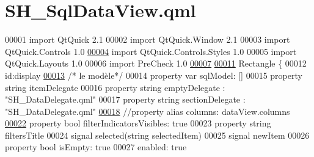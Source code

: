 \hypertarget{SH__SqlDataView_8qml}{\section{S\-H\-\_\-\-Sql\-Data\-View.\-qml}
\label{SH__SqlDataView_8qml}
}

\begin{DoxyCode}
00001 \textcolor{keyword}{import} QtQuick 2.1
00002 import QtQuick.Window 2.1
00003 import QtQuick.Controls 1.0
\hypertarget{SH__SqlDataView_8qml_source_l00004}{}\hyperlink{classSH__SqlDataView}{00004} import QtQuick.Controls.Styles 1.0
00005 import QtQuick.Layouts 1.0
00006 import PreCheck 1.0
\hypertarget{SH__SqlDataView_8qml_source_l00007}{}\hyperlink{classSH__SqlDataView_ad538d6f1dd43a7d01c7960a74ca131dc}{00007} 
\hypertarget{SH__SqlDataView_8qml_source_l00011}{}\hyperlink{classSH__SqlDataView_af2c0c75bb57606451699027fa74eeda2}{00011} Rectangle \{
00012     \textcolor{keywordtype}{id}:display
\hypertarget{SH__SqlDataView_8qml_source_l00013}{}\hyperlink{classSH__SqlDataView_a60486947b034f5fca72a2d5775ad1767}{00013}     \textcolor{comment}{/* le modèle*/}
00014     \textcolor{keyword}{property} var sqlModel: []
00015     \textcolor{keyword}{property} \textcolor{keywordtype}{string} itemDelegate
00016     \textcolor{keyword}{property} \textcolor{keywordtype}{string} emptyDelegate : \textcolor{stringliteral}{"SH\_DataDelegate.qml"}
00017     \textcolor{keyword}{property} \textcolor{keywordtype}{string} sectionDelegate : \textcolor{stringliteral}{"SH\_DataDelegate.qml"}
\hypertarget{SH__SqlDataView_8qml_source_l00018}{}\hyperlink{classSH__SqlDataView_afdc0805dc2ce3af4e9ce5331a81d7e13}{00018}     \textcolor{comment}{//property alias columns: dataView.columns}
\hypertarget{SH__SqlDataView_8qml_source_l00022}{}\hyperlink{classSH__SqlDataView_a3ceaf016d4dace986a92e2e77772bac9}{00022} \textcolor{comment}{}    \textcolor{keyword}{property} \textcolor{keywordtype}{bool} filterIndicatorsVisibles: \textcolor{keyword}{true}
00023     \textcolor{keyword}{property} \textcolor{keywordtype}{string} filtersTitle
00024     signal selected(\textcolor{keywordtype}{string} selectedItem)
00025     signal newItem
00026     \textcolor{keyword}{property} \textcolor{keywordtype}{bool} isEmpty: \textcolor{keyword}{true}
00027     enabled: \textcolor{keyword}{true}

\end{DoxyCode}
